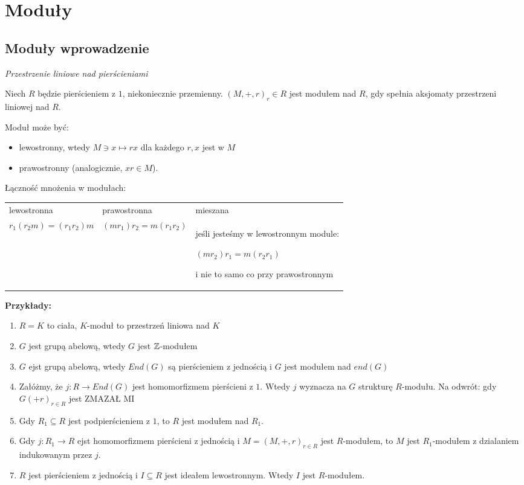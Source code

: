 \section{Moduły}

\setcounter{section}{10}
\setcounter{theorem}{2}
\subsection{Moduły wprowadzenie}

\emph{Przestrzenie liniowe nad pierścieniami}

\begin{definition}
    Niech $R$ będzie pierścieniem z $1$, niekoniecznie przemienny. $(M,+,r)_r\in R$ jest modułem nad $R$, gdy spełnia aksjomaty przestrzeni liniowej nad $R$.

    Moduł może być:
    \begin{itemize}
        \item[\PHtunny] lewostronny, wtedy $M\ni x\mapsto rx$ dla każdego $r,x$ jest w $M$
        \item[\PHtunny] prawostronny (analogicznie, $xr\in M$).
    \end{itemize}
\end{definition}

Łączność mnożenia w modułach:

\begin{tabular}{ p{5cm} p{5cm} p{5cm} }
lewostronna & prawostronna & mieszana \\

$r_1(r_2m)=(r_1r_2)m$

&

$(mr_1)r_2=m(r_1r_2)$

&

jeśli jesteśmy w lewostronnym module:

$(mr_2)r_1=m(r_2r_1)$

i nie to samo co przy prawostronnym
\end{tabular}

\textbf{Przykłady:}

\begin{enumerate}
    \item $R=K$ to ciała, $K$-moduł to przestrzeń liniowa nad $K$
    \item $G$ jest grupą abelową, wtedy $G$ jest $\mathbb{Z}$-modułem
    \item $G$ ejst grupą abelową, wtedy $End(G)$ są pierścieniem z jednością i $G$ jest modułem nad $end(G)$
    \item Załóżmy, że $j:R\to End(G)$ jest homomorfizmem pierścieni z $1$. Wtedy $j$ wyznacza na $G$ strukturę $R$-modułu. Na odwrót: gdy $G(+r)_{r\in R}$ jest {\large\color{orange}ZMAZAŁ MI}
    \item Gdy $R_1\subseteq R$ jest podpierścieniem z $1$, to $R$ jest modułem nad $R_1$.
    \item Gdy $j:R_1\to R$ ejst homomorfizmem pierścieni z jednością i $M=(M,+,r)_{r\in R}$ jest $R$-modułem, to $M$ jest $R_1$-modułem z dzialaniem indukowanym przez $j$.
    \item $R$ jest pierścieniem z jednością i $I\subseteq R$ jest ideałem lewostronnym. Wtedy $I$ jest $R$-modułem.
\end{enumerate}

